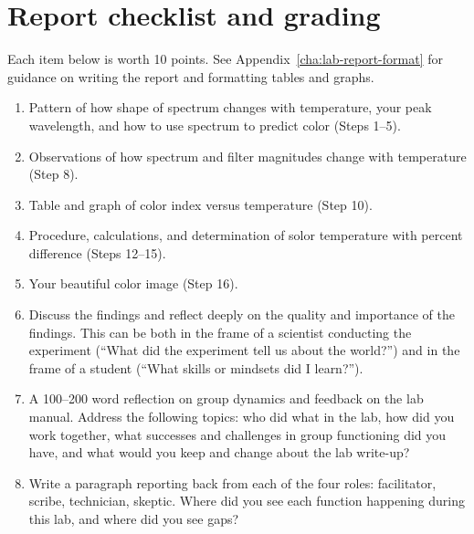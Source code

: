\section{Report checklist and grading}

Each item below is worth 10 points. See Appendix\ \ref{cha:lab-report-format} for guidance on writing the report and formatting tables and graphs.

\begin{enumerate}
	
	\item Pattern of how shape of spectrum changes with temperature, your peak wavelength, and how to use spectrum to predict color (Steps 1--5).
	
	\item Observations of how spectrum and filter magnitudes change with temperature (Step 8).
	
	\item Table and graph of color index versus temperature (Step 10).
	
	\item Procedure, calculations, and determination of solor temperature with percent difference (Steps 12--15).
	
	\item Your beautiful color image (Step 16).
	
	\item Discuss the findings and reflect deeply on the quality and importance of the findings. This can
	be both in the frame of a scientist conducting the experiment (“What did the experiment tell us
	about the world?”) and in the frame of a student (“What skills or mindsets did I learn?”).
	
	\item A 100–200 word reflection on group dynamics and feedback on the lab manual. Address the
	following topics: who did what in the lab, how did you work together, what successes and
	challenges in group functioning did you have, and what would you keep and change about the
	lab write-up?
	
	\item Write a paragraph reporting back from each of the four roles: facilitator, scribe, technician,
	skeptic. Where did you see each function happening during this lab, and where did you see
	gaps?
\end{enumerate}
